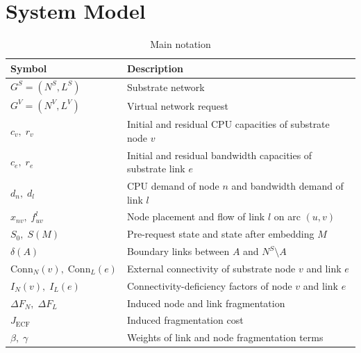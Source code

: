 \documentclass{ieeeaccess}
\begin{document}
\section{System Model}
\label{sec:system_model}

\begin{table}[!t]
	\caption{Main notation}
	\label{tab:notation}
	\centering
	\setlength{\tabcolsep}{3pt}
	\renewcommand{\arraystretch}{1.12}
	
	\begin{tabular}{|p{}|p{}|}
		\hline
		\textbf{Symbol} & \textbf{Description}                                            \\
		\hline
		$G^S=(N^S,L^S)$ & Substrate network                                               \\
		\hline
		$G^V=(N^V,L^V)$ & Virtual network request                                         \\
		\hline
		$c_v,\;r_v$ & Initial and residual CPU capacities of substrate node $v$           \\
		\hline
		$c_e,\;r_e$ & Initial and residual bandwidth capacities of substrate link $e$     \\
		\hline
		$d_n,\;d_l$ & CPU demand of node $n$ and bandwidth demand of link $l$              \\
		\hline
		$x_{nv},\;f_{uv}^l$ & Node placement and flow of link $l$ on arc $(u,v)$           \\
		\hline
		$S_0,\;S(M)$ & Pre-request state and state after embedding $M$                    \\
		\hline
		$\delta(A)$ & Boundary links between $A$ and $N^S\setminus A$                     \\
		\hline
		$\mathrm{Conn}_N(v),\;\mathrm{Conn}_L(e)$
		& External connectivity of substrate node $v$ and link $e$                      \\
		\hline
		$I_N(v),\;I_L(e)$ & Connectivity-deficiency factors of node $v$ and link $e$       \\
		\hline
		$\Delta F_N,\;\Delta F_L$ & Induced node and link fragmentation                   \\
		\hline
		$J_{\mathrm{ECF}}$ & Induced fragmentation cost                                   \\
		\hline
		$\beta,\;\gamma$ & Weights of link and node fragmentation terms                  \\
		\hline
	\end{tabular}
\end{table}
\end{document}
